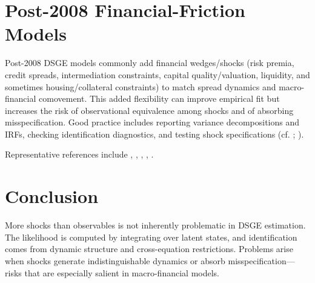 \documentclass[11pt]{article}
\begin{document}
\section{Post-2008 Financial-Friction Models}

Post-2008 DSGE models commonly add financial wedges/shocks (risk premia, credit spreads, intermediation constraints,
capital quality/valuation, liquidity, and sometimes housing/collateral constraints) to match spread dynamics and macro-financial
comovement. This added flexibility can improve empirical fit but increases the risk of observational equivalence among shocks
and of absorbing misspecification. Good practice includes reporting variance decompositions and IRFs, checking identification
diagnostics, and testing shock specifications (cf. \citealt{denhaan2021asd}; \citealt{curdia2012}).

Representative references include \citet{bgg1999}, \citet{iacoviello2005}, \citet{gerali2010}, \citet{gertlerkaradi2011},
\citet{christiano2014}.

\section*{Conclusion}

More shocks than observables is not inherently problematic in DSGE estimation. The likelihood is computed by integrating
over latent states, and identification comes from dynamic structure and cross-equation restrictions. Problems arise when shocks
generate indistinguishable dynamics or absorb misspecification---risks that are especially salient in macro-financial models.
\end{document}

